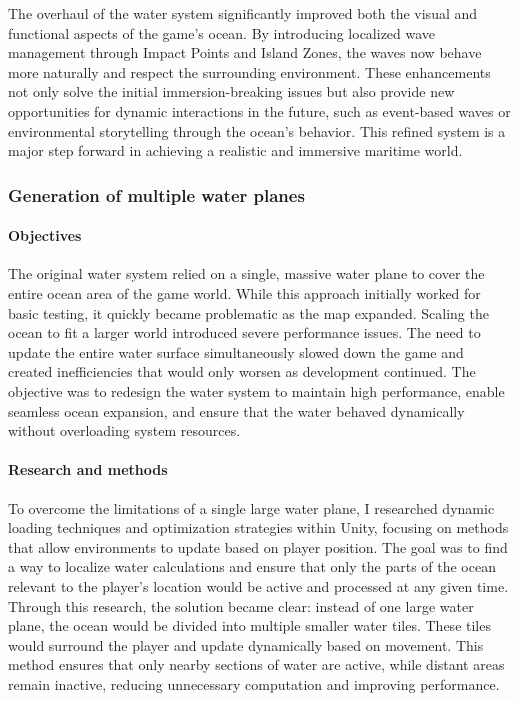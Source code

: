 \documentclass{article}
\begin{document}
The overhaul of the water system significantly improved both the visual and functional aspects of the game's ocean. By introducing localized wave management through Impact Points and Island Zones, the waves now behave more naturally and respect the surrounding environment. These enhancements not only solve the initial immersion-breaking issues but also provide new opportunities for dynamic interactions in the future, such as event-based waves or environmental storytelling through the ocean's behavior. This refined system is a major step forward in achieving a realistic and immersive maritime world.



\subsubsection{Generation of multiple water planes}
\paragraph{Objectives}\hfill

The original water system relied on a single, massive water plane to cover the entire ocean area of the game world. While this approach initially worked for basic testing, it quickly became problematic as the map expanded. Scaling the ocean to fit a larger world introduced severe performance issues. The need to update the entire water surface simultaneously slowed down the game and created inefficiencies that would only worsen as development continued. The objective was to redesign the water system to maintain high performance, enable seamless ocean expansion, and ensure that the water behaved dynamically without overloading system resources.

\paragraph{Research and methods}\hfill

To overcome the limitations of a single large water plane, I researched dynamic loading techniques and optimization strategies within Unity, focusing on methods that allow environments to update based on player position. The goal was to find a way to localize water calculations and ensure that only the parts of the ocean relevant to the player's location would be active and processed at any given time.\\

Through this research, the solution became clear: instead of one large water plane, the ocean would be divided into multiple smaller water tiles. These tiles would surround the player and update dynamically based on movement. This method ensures that only nearby sections of water are active, while distant areas remain inactive, reducing unnecessary computation and improving performance.
\end{document}
